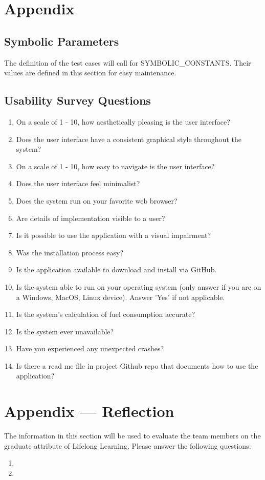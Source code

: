 \documentclass[12pt, titlepage]{article}
\begin{document}
\section{Appendix}

\subsection{Symbolic Parameters}

The definition of the test cases will call for SYMBOLIC\_CONSTANTS.
Their values are defined in this section for easy maintenance.

\subsection{Usability Survey Questions}

\begin{enumerate}
  \item On a scale of 1 - 10, how aesthetically pleasing is the user interface?
  \item Does the user interface have a consistent graphical style throughout the system?
  \item On a scale of 1 - 10, how easy to navigate is the user interface?
  \item Does the user interface feel minimalist?
  \item Does the system run on your favorite web browser?
  \item Are details of implementation visible to a user?
  \item Is it possible to use the application with a visual impairment?
  \item Was the installation process easy?
  \item Is the application available to download and install via GitHub.
  \item Is the system able to run on your operating system (only answer if you are on a Windows, MacOS, Linux device). Answer 'Yes' if not applicable.
  \item Is the system's calculation of fuel consumption accurate?
  \item Is the system ever unavailable?
  \item Have you experienced any unexpected crashes?
  \item Is there a read me file in project Github repo that documents how to use the application?
\end{enumerate}

\newpage{}
\section*{Appendix --- Reflection}

The information in this section will be used to evaluate the team members on the
graduate attribute of Lifelong Learning.  Please answer the following questions:

\begin{enumerate}
  \item 
  \item 
\end{enumerate}
\end{document}
